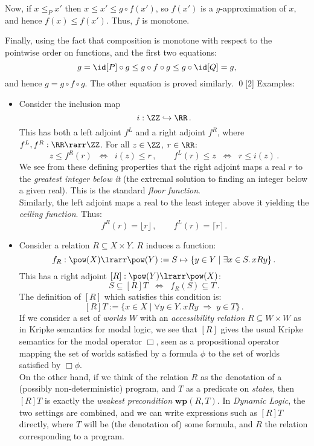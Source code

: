 \documentclass[12pt]{article}
\begin{document}
Now, if $x \leq_{P} x'$ then $x \leq x' \leq g \circ f(x')$, so $f(x')$ is a $g$-approximation of $x$, and hence $f(x) \leq f(x')$. Thus,
$f$ is monotone.

Finally, using the fact that composition is monotone with
respect to the pointwise order on functions, and the first two equations:
\[ g = \id[P] \circ g \leq g \circ f \circ g \leq g \circ \id[Q] = g, \]
and hence $g = g \circ f \circ g$. The other equation is proved similarly. \qed[2]
%
Examples:
\begin{itemize}
\item Consider the inclusion map
\[ i : \ZZ \hookrightarrow \RR\,. \]
This has both a left adjoint $f^{L}$ and a right adjoint $f^{R}$, where $f^{L}, f^{R} : \RR \rarr \ZZ$. For all $z \in \ZZ$, $r \in \RR$:
\[ z \leq f^{R}(r)  \;\; \Longleftrightarrow \;\;  i(z) \leq r \,,\qquad f^{L}(r) \leq z  \;\; \Longleftrightarrow \;\;  r \leq i(z)\,. \]
We see from these defining properties that the right adjoint maps a real $r$ to the \emph{greatest integer below it} (the extremal solution to finding
an integer below a given real). This is the standard \emph{floor function}.\\ Similarly, the left adjoint maps a real to the least integer above it
yielding the \emph{ceiling function}. Thus:
\[ f^{R}(r) = \lfloor r \rfloor\,, \qquad f^{L}(r) = \lceil r \rceil\,. \]
%
\item Consider a relation $R \subseteq  X \times Y$. $R$ induces a function:
\[ f_{R} : \pow(X) \lrarr \pow(Y):= S \mapsto \{ y \in Y \mid \exists x \in S.\, xRy \}\,. \]
This has a right adjoint $[R] : \pow(Y) \lrarr \pow(X)$:
\[ S \subseteq [R]T \;\; \Longleftrightarrow \;\; f_{R}(S) \subseteq T\,. \]
The definition of $[R]$ which satisfies this condition is:
\[ [R]T := \{ x \in X \mid \forall y \in Y. \, xRy \; \Rightarrow \; y \in T \}\,. \]
If we consider a set of \emph{worlds} $W$ with an \emph{accessibility relation} $R \subseteq W \times W$ as in Kripke semantics for modal logic, we see
that $[R]$ gives the usual Kripke semantics for the modal operator $\Box$, seen as a propositional operator mapping the set of worlds satisfied by a
formula $\phi$ to the set of worlds satisfied by $\Box \phi$.
\\
On the other hand, if we think of the relation $R$ as the denotation of a (possibly non-deterministic) program, and $T$ as a predicate on
\emph{states}, then $[R]T$ is exactly the \emph{weakest precondition} $\mathbf{wp}(R, T)$. In \emph{Dynamic Logic}, the two settings are combined, and
we can write expressions such as $[R]T$ directly, where $T$ will be (the denotation of) some formula, and $R$ the relation corresponding to a program.

\end{itemize}
\end{document}
